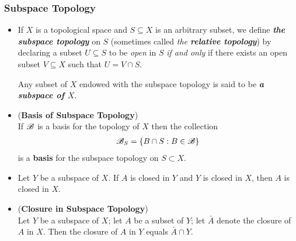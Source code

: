 \documentclass[11pt]{article}
\begin{document}
\subsubsection{Subspace Topology}
\begin{itemize}
\item \begin{definition}
If $X$ is a topological space and $S \subseteq X$ is an arbitrary subset, we define \emph{\textbf{the subspace topology}} on $S$ (sometimes called \emph{the \textbf{relative topology}}) by declaring a subset $U \subseteq S$ to be \emph{open} in $S$ \emph{if and only} if there exists an open subset $V \subseteq X$ such that $U = V \cap S$. 

Any subset of $X$ endowed with the subspace topology is said to be \emph{\textbf{a subspace of $X$}}.
\end{definition}

\item \begin{lemma} (\textbf{Basis of Subspace Topology})\\
If ${\mathscr B}$ is a basis for the topology of $X$ then the collection
\begin{align*}
{\mathscr B}_{S} = \left\{B \cap S:  B \in {\mathscr B}\right\}
\end{align*}
is a \textbf{basis}  for the subspace topology on $S \subset X$.
\end{lemma}

\item \begin{proposition}
Let $Y$ be a subspace of $X$. If $A$ is closed in $Y$ and $Y$ is closed in $X$, then $A$ is closed in $X$.
\end{proposition}

\item \begin{proposition} (\textbf{Closure in Subspace Topology})\\
Let $Y$ be a subspace of $X$; let $A$ be a subset of $Y$; let $\bar{A}$ denote the closure of $A$ in $X$. Then the closure of $A$ in $Y$ equals $\bar{A} \cap Y$.
\end{proposition}
\end{itemize}
\end{document}
